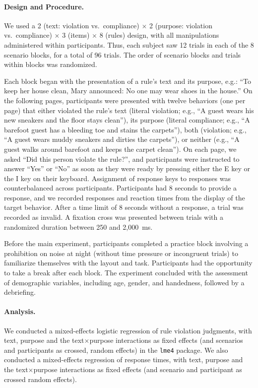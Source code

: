 \documentclass[pdflatex,sn-nature]{sn-jnl}
\begin{document}
\paragraph{Design and Procedure.}
We used a 2 (text: violation vs.\ compliance) $\times$ 2 (purpose: violation vs.\ compliance) $\times$ 3 (items) $\times$ 8 (rules) design, with all manipulations administered within participants. Thus, each subject saw 12 trials in each of the 8 scenario blocks, for a total of 96 trials. The order of scenario blocks and trials within blocks was randomized.

Each block began with the presentation of a rule's text and its purpose, e.g.: ``To keep her house clean, Mary announced: No one may wear shoes in the house.'' On the following pages, participants were presented with twelve behaviors (one per page) that either violated the rule's text (literal violation; e.g., ``A guest wears his new sneakers and the floor stays clean''), its purpose (literal compliance; e.g., ``A barefoot guest has a bleeding toe and stains the carpets''), both (violation; e.g., ``A guest wears muddy sneakers and dirties the carpets''), or neither (e.g., ``A guest walks around barefoot and keeps the carpet clean''). On each page, we asked ``Did this person violate the rule?'', and participants were instructed to answer ``Yes'' or ``No'' as soon as they were ready by pressing either the E key or the I key on their keyboard. Assignment of response keys to responses was counterbalanced across participants. Participants had 8 seconds to provide a response, and we recorded responses and reaction times from the display of the target behavior. After a time limit of 8 seconds without a response, a trial was recorded as invalid. A fixation cross was presented between trials with a randomized duration between 250 and 2,000~ms.

Before the main experiment, participants completed a practice block involving a prohibition on noise at night (without time pressure or incongruent trials) to familiarize themselves with the layout and task. Participants had the opportunity to take a break after each block. The experiment concluded with the assessment of demographic variables, including age, gender, and handedness, followed by a debriefing.

\paragraph{Analysis.}
We conducted a mixed-effects logistic regression of rule violation judgments, with text, purpose and the text$\times$purpose interactions as fixed effects (and scenarios and participants as crossed, random effects) in the \texttt{lme4} package. We also conducted a mixed-effects regression of response times, with text, purpose and the text$\times$purpose interactions as fixed effects (and scenario and participant as crossed random effects).
\end{document}
